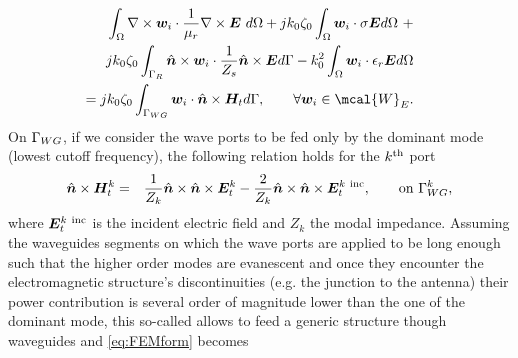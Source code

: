 \begin{eqnarray}
\label{eq:FEMform}
\int_\mrm{\Omega} \nabla \times \mbfit{w}_i \cdot \frac{1}{\mu_r} \nabla \times \mbfit{E} \ d\mrm{\Omega} + j k_0 \zeta_0 \int_\mrm{\Omega} \mbfit{w}_i \cdot \sigma \mbfit{E} d\mrm{\Omega} \ + \nonumber \\
 j k_0 \zeta_0 \int_{\mrm{\Gamma}_R} \hat{\mbfit{n}} \times \mbfit{w}_i \cdot \frac{1}{Z_s} \hat{\mbfit{n}} \times \mbfit{E} d\mrm{\Gamma} - k_0^2 \int_\mrm{\Omega} \mbfit{w}_i \cdot \epsilon_r \mbfit{E} d\mrm{\Omega} \nonumber \\
\hspace{-10cm} = j k_0 \zeta_0 \int_{\mrm{\Gamma}_{WG}} \mbfit{w}_i \cdot \hat{\mbfit{n}} \times \mbfit{H}_t d\mrm{\Gamma}, \qquad \forall \mbfit{w}_i \in \mcal{W}_E.
\end{eqnarray} On $\mathrm{\Gamma}_{WG}$, if we consider the wave ports to be fed only by the dominant mode (lowest cutoff frequency), the following relation holds for the $k^{\mathrm{th}}$ port \cite{PelosiCoccioliSelleriQFEEF, ZhuCangellarisMFEMEFM}
\begin{eqnarray}
\hat{\mbfit{n}} \times \mbfit{H}_t^k & = & \frac{1}{Z_k} \hat{\mbfit{n}} \times \hat{\mbfit{n}} \times \mbfit{E}_t^k - \frac{2}{Z_k} \hat{\mbfit{n}} \times \hat{\mbfit{n}} \times \mbfit{E}_t^{k \ \mrm{inc}}, \qquad \mrm{on} \ \mrm{\Gamma}_{WG}^k,
\end{eqnarray} where $\mbfit{E}_t^{k \ \mrm{inc}}$ is the incident electric field and ${Z_k}$ the modal impedance. Assuming the waveguides segments on which the wave ports are applied to be long enough such that the higher order modes are evanescent and once they encounter the electromagnetic structure's discontinuities (e.g. the junction to the antenna) their power contribution is several order of magnitude lower than the one of the dominant mode, this so-called  \cite{ZhuCangellarisMFEMEFM} allows to feed a generic structure though waveguides and \eqref{eq:FEMform} becomes
